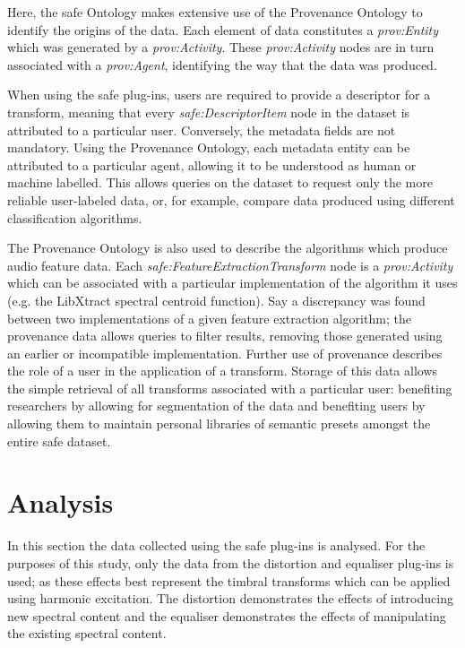 		Here, the \acrshort{safe} Ontology makes extensive use of the Provenance Ontology \citep{provenance} to
		identify the origins of the data.  Each element of data constitutes a \emph{prov:Entity} which was
		generated by a \emph{prov:Activity}. These \emph{prov:Activity} nodes are in turn associated with a
		\emph{prov:Agent}, identifying the way that the data was produced.

		When using the \acrshort{safe} plug-ins, users are required to provide a descriptor for a transform,
		meaning that every \emph{safe:DescriptorItem} node in the dataset is attributed to a particular user.
		Conversely, the metadata fields are not mandatory. Using the Provenance Ontology, each metadata entity can
		be attributed to a particular agent, allowing it to be understood as human or machine labelled. This allows
		queries on the dataset to request only the more reliable user-labeled data, or, for example, compare data
		produced using different classification algorithms.

		The Provenance Ontology is also used to describe the algorithms which produce audio feature data. Each
		\emph{safe:FeatureExtractionTransform} node is a \emph{prov:Activity} which can be associated with a
		particular implementation of the algorithm it uses (e.g. the LibXtract \citep{bullock2007libxtract}
		spectral centroid function). Say a discrepancy was found between two implementations of a given feature
		extraction algorithm; the provenance data allows queries to filter results, removing those generated using
		an earlier or incompatible implementation. Further use of provenance describes the role of a user in the
		application of a transform. Storage of this data allows the simple retrieval of all transforms associated
		with a particular user: benefiting researchers by allowing for segmentation of the data and benefiting
		users by allowing them to maintain personal libraries of semantic presets amongst the entire
		\acrshort{safe} dataset.

\section{Analysis}
\label{sec:TimbreEvaluation-Analysis}
	In this section the data collected using the \acrshort{safe} plug-ins is analysed. For the purposes of this study,
	only the data from the distortion and equaliser plug-ins is used; as these effects best represent the timbral
	transforms which can be applied using harmonic excitation. The distortion demonstrates the effects of introducing
	new spectral content and the equaliser demonstrates the effects of manipulating the existing spectral content.

